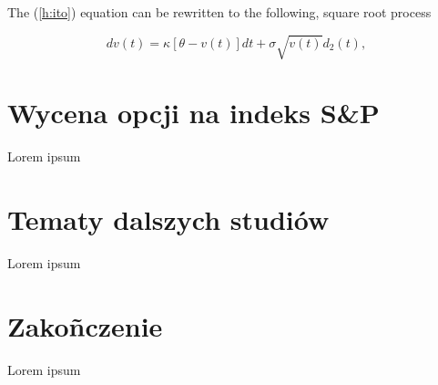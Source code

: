 \documentclass{pracamgr}
\begin{document}
The (\ref{h:ito}) equation can be rewritten to the following, square root process

\begin{equation}\label{h:squareroot}
dv(t) = \kappa [\theta - v(t)] dt + \sigma \sqrt{v(t)} d_2 (t),
\end{equation}

\chapter{Wycena opcji na indeks S\&P}\label{r:sp}
Lorem ipsum
 
 \chapter{Tematy dalszych studiów}\label{r:next}
Lorem ipsum
 \chapter*{Zakoñczenie}\label{r:ending}
Lorem ipsum



\appendix

%

%
\end{document}

